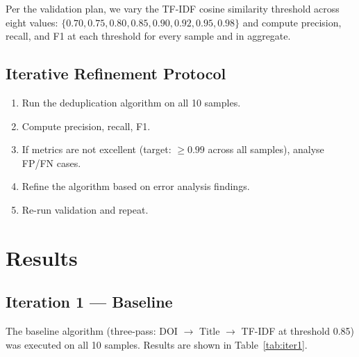 \documentclass[conference]{IEEEtran}
\begin{document}
Per the validation plan, we vary the TF-IDF cosine similarity threshold across eight values: $\{0.70, 0.75, 0.80, 0.85, 0.90, 0.92, 0.95, 0.98\}$ and compute precision, recall, and F1 at each threshold for every sample and in aggregate.

\subsection{Iterative Refinement Protocol}

\begin{enumerate}
    \item Run the deduplication algorithm on all 10 samples.
    \item Compute precision, recall, F1.
    \item If metrics are not excellent (target: $\geq 0.99$ across all samples), analyse FP/FN cases.
    \item Refine the algorithm based on error analysis findings.
    \item Re-run validation and repeat.
\end{enumerate}

\section{Results}

\subsection{Iteration 1 --- Baseline}

The baseline algorithm (three-pass: DOI $\rightarrow$ Title $\rightarrow$ TF-IDF at threshold 0.85) was executed on all 10 samples. Results are shown in Table~\ref{tab:iter1}.
\end{document}
